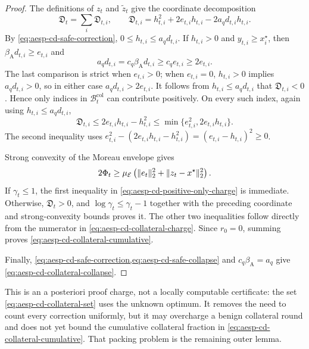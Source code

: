 \begin{proof}
The definitions of $z_t$ and $\widetilde z_t$ give the coordinate
decomposition
\begin{equation}
 \mathfrak D_t
 =\sum_i\mathfrak D_{t,i},
 \qquad
 \mathfrak D_{t,i}
 =h_{t,i}^2+2e_{t,i}h_{t,i}
   -2a_qd_{t,i}h_{t,i}.
 \label{eq:aesp-cd-coordinate-defect}
\end{equation}
By \cref{eq:aesp-cd-safe-correction},
$0\leq h_{t,i}\leq a_qd_{t,i}$.  If $h_{t,i}>0$ and
$y_{t,i}\geq x_i^\star$, then
$\beta_{\mathrm A}d_{t,i}\geq e_{t,i}$ and
\begin{equation*}
 a_qd_{t,i}
 =c_q\beta_{\mathrm A}d_{t,i}
 \geq c_qe_{t,i}\geq2e_{t,i}.
\end{equation*}
The last comparison is strict when $e_{t,i}>0$; when $e_{t,i}=0$,
$h_{t,i}>0$ implies $a_qd_{t,i}>0$, so in either case
$a_qd_{t,i}>2e_{t,i}$.  It follows from
$h_{t,i}\leq a_qd_{t,i}$ that
$\mathfrak D_{t,i}<0$.  Hence only indices in
$\mathcal B_t^{\mathrm{col}}$ can contribute positively.  On every such
index, again using $h_{t,i}\leq a_qd_{t,i}$,
\begin{equation*}
 \mathfrak D_{t,i}
 \leq2e_{t,i}h_{t,i}-h_{t,i}^2
 \leq\min\{e_{t,i}^2,2e_{t,i}h_{t,i}\}.
\end{equation*}
The second inequality uses
$e_{t,i}^2-(2e_{t,i}h_{t,i}-h_{t,i}^2)
=(e_{t,i}-h_{t,i})^2\geq0$.

Strong convexity of the Moreau envelope gives
\begin{equation*}
 2\Phi_t
 \geq\mu_{\mathcal E}
 \left(\lVert e_t\rVert_2^2+\lVert z_t-x^\star\rVert_2^2\right).
\end{equation*}
If $\gamma_t\leq1$, the first inequality in
\cref{eq:aesp-cd-positive-only-charge} is immediate.  Otherwise,
$\mathfrak D_t>0$, and $\log\gamma_t\leq\gamma_t-1$ together with the
preceding coordinate and strong-convexity bounds proves it.  The other two
inequalities follow directly from the numerator in
\cref{eq:aesp-cd-collateral-charge}.  Since $r_0=0$, summing proves
\cref{eq:aesp-cd-collateral-cumulative}.

Finally,
\cref{eq:aesp-cd-safe-correction,eq:aesp-cd-safe-collapse} and
$c_q\beta_{\mathrm A}=a_q$ give
\cref{eq:aesp-cd-collateral-collapse}.
\end{proof}

This is an a posteriori proof charge, not a locally computable certificate:
the set \cref{eq:aesp-cd-collateral-set} uses the unknown optimum.  It removes
the need to count every correction uniformly, but it may overcharge a benign
collateral round and does not yet bound the cumulative collateral fraction in
\cref{eq:aesp-cd-collateral-cumulative}.  That packing problem is the
remaining outer lemma.

